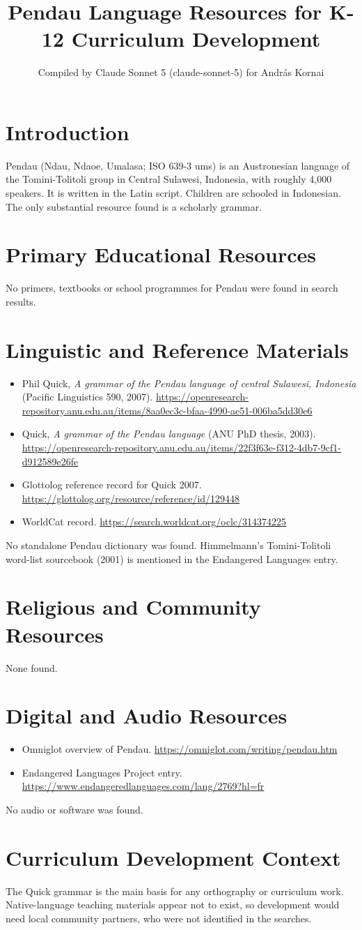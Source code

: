 \documentclass[12pt]{article}
\title{Pendau Language Resources for K-12 Curriculum Development}
\author{Compiled by Claude Sonnet 5 (claude-sonnet-5) for Andr\'as Kornai}
\date{}
\begin{document}
\maketitle
\section{Introduction}
Pendau (Ndau, Ndaoe, Umalasa; ISO 639-3 ums) is an Austronesian language of the Tomini-Tolitoli group in Central Sulawesi, Indonesia, with roughly 4,000 speakers. It is written in the Latin script. Children are schooled in Indonesian. The only substantial resource found is a scholarly grammar.
\section{Primary Educational Resources}
No primers, textbooks or school programmes for Pendau were found in search results.
\section{Linguistic and Reference Materials}
\begin{itemize}
\item Phil Quick, \emph{A grammar of the Pendau language of central Sulawesi, Indonesia} (Pacific Linguistics 590, 2007). \url{https://openresearch-repository.anu.edu.au/items/8aa0ec3c-bfaa-4990-ae51-006ba5dd30e6}
\item Quick, \emph{A grammar of the Pendau language} (ANU PhD thesis, 2003). \url{https://openresearch-repository.anu.edu.au/items/22f3f63e-f312-4db7-9cf1-d912589e26fe}
\item Glottolog reference record for Quick 2007. \url{https://glottolog.org/resource/reference/id/129448}
\item WorldCat record. \url{https://search.worldcat.org/oclc/314374225}
\end{itemize}
No standalone Pendau dictionary was found. Himmelmann's Tomini-Tolitoli word-list sourcebook (2001) is mentioned in the Endangered Languages entry.
\section{Religious and Community Resources}
None found.
\section{Digital and Audio Resources}
\begin{itemize}
\item Omniglot overview of Pendau. \url{https://omniglot.com/writing/pendau.htm}
\item Endangered Languages Project entry. \url{https://www.endangeredlanguages.com/lang/2769?hl=fr}
\end{itemize}
No audio or software was found.
\section{Curriculum Development Context}
The Quick grammar is the main basis for any orthography or curriculum work. Native-language teaching materials appear not to exist, so development would need local community partners, who were not identified in the searches.
\end{document}
